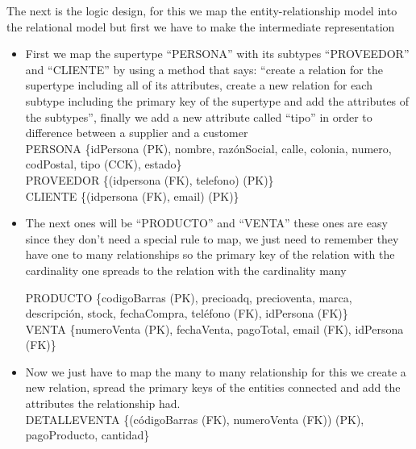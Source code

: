 \documentclass{article}
\begin{document}
The next is the logic design, for this we map the entity-relationship model into the relational model but first we have to make the intermediate representation\\

\begin{itemize}
\item First we map the supertype “PERSONA” with its subtypes “PROVEEDOR” and “CLIENTE” by using a method that says: “create a relation for the supertype including all of its attributes, create a new relation for each subtype including the primary key of the supertype and add the attributes of the subtypes”, finally we add a new attribute called “tipo” in order to difference between a supplier and a customer\\

PERSONA \{id\textunderscore Persona (PK), nombre, razón\textunderscore Social, calle, colonia, numero, cod\textunderscore Postal, tipo (CCK), estado\}\\

PROVEEDOR \{(id\textunderscore persona (FK), telefono) (PK)\}\\

CLIENTE \{(id\textunderscore persona (FK), email) (PK)\}\\

\item The next ones will be “PRODUCTO” and “VENTA” these ones are easy since they don’t need a special rule to map, we just need to remember they have one to many relationships so the primary key of the relation with the cardinality one spreads to the relation with the cardinality many

PRODUCTO \{codigo\textunderscore Barras (PK), precio\textunderscore adq, precio\textunderscore venta, marca, descripción, stock, fecha\textunderscore Compra, teléfono (FK), id\textunderscore Persona (FK)\}\\

VENTA \{numero\textunderscore Venta (PK), fecha\textunderscore Venta, pago\textunderscore Total, email (FK), id\textunderscore Persona (FK)\}\\

\item Now we just have to map the many to many relationship for this we create a new relation, spread the primary keys of the entities connected and add the attributes the relationship had.\\

DETALLE\textunderscore VENTA \{(código\textunderscore Barras (FK), numero\textunderscore Venta (FK)) (PK), pago\textunderscore Producto, cantidad\}
\end{itemize}
\end{document}
